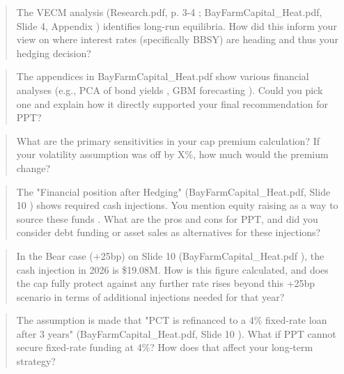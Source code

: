 \documentclass[11pt, a4paper, british]{article}
\begin{document}
\newpage

\begin{quote}
    The VECM analysis (Research.pdf, p. 3-4 ; BayFarmCapital_Heat.pdf, Slide 4, Appendix ) identifies long-run equilibria. How did this inform your view on where interest rates (specifically BBSY) are heading and thus your hedging decision?
\end{quote}

\newpage

\begin{quote}
    The appendices in BayFarmCapital_Heat.pdf show various financial analyses (e.g., PCA of bond yields , GBM forecasting ). Could you pick one and explain how it directly supported your final recommendation for PPT?
\end{quote}

\newpage

\begin{quote}
    What are the primary sensitivities in your cap premium calculation? If your volatility assumption was off by X\%, how much would the premium change?
\end{quote}

\newpage

\begin{quote}
    The "Financial position after Hedging" (BayFarmCapital_Heat.pdf, Slide 10 ) shows required cash injections. You mention equity raising as a way to source these funds . What are the pros and cons for PPT, and did you consider debt funding or asset sales as alternatives for these injections?
\end{quote}

\newpage

\begin{quote}
    In the Bear case (+25bp) on Slide 10 (BayFarmCapital_Heat.pdf ), the cash injection in 2026 is \$19.08M. How is this figure calculated, and does the cap fully protect against any further rate rises beyond this +25bp scenario in terms of additional injections needed for that year?
\end{quote}

\newpage

\begin{quote}
    The assumption is made that "PCT is refinanced to a 4\% fixed-rate loan after 3 years" (BayFarmCapital_Heat.pdf, Slide 10 ). What if PPT cannot secure fixed-rate funding at 4\%? How does that affect your long-term strategy?
\end{quote}
\end{document}

